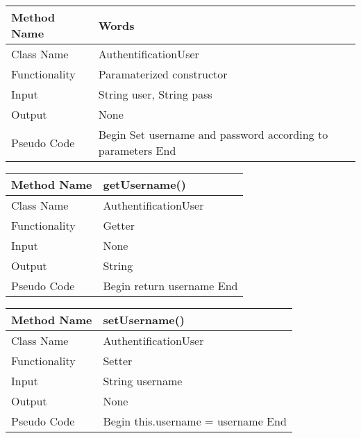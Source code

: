 \documentclass{article}
\newcommand\tab[1][1cm]{\hspace*{#1}}
\begin{document}
\begin{center}
\begin{tabular}{|p{2.5cm}||p{10cm}|}
\hline
Method Name & Words \\
\hline
Class Name & AuthentificationUser \\
\hline
Functionality & Paramaterized constructor\\
\hline
Input & String user, String pass\\
\hline
Output & None\\
\hline
Pseudo Code & Begin\newline
\tab Set username and password according to parameters\newline
End \\
\hline
\end{tabular}
\end{center}

\begin{center}
\begin{tabular}{|p{2.5cm}||p{10cm}|}
\hline
Method Name & getUsername() \\
\hline
Class Name & AuthentificationUser \\
\hline
Functionality & Getter\\
\hline
Input & None\\
\hline
Output & String\\
\hline
Pseudo Code & Begin\newline
\tab return username\newline
End \\
\hline
\end{tabular}
\end{center}

\begin{center}
\begin{tabular}{|p{2.5cm}||p{10cm}|}
\hline
Method Name & setUsername() \\
\hline
Class Name & AuthentificationUser \\
\hline
Functionality & Setter\\
\hline
Input & String username\\
\hline
Output & None\\
\hline
Pseudo Code & Begin\newline
\tab this.username = username\newline
End \\
\hline
\end{tabular}
\end{center}
\end{document}
